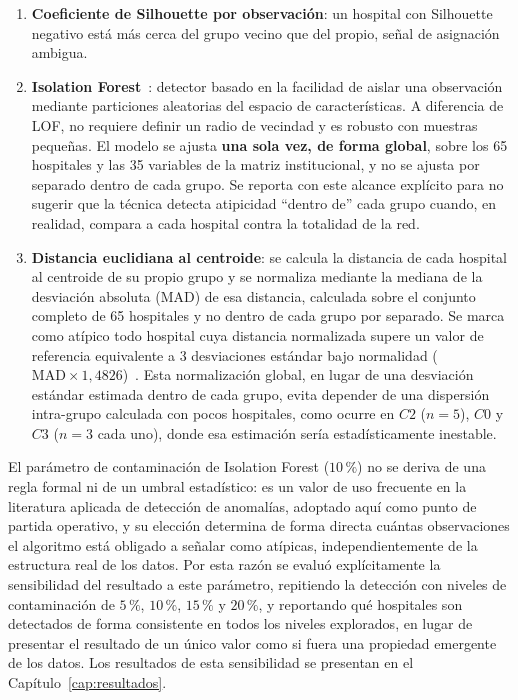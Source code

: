 \begin{enumerate}
  \item \textbf{Coeficiente de Silhouette por observación}: un hospital con
    Silhouette negativo está más cerca del grupo vecino que del propio, señal de
    asignación ambigua.
  \item \textbf{Isolation Forest}~\citep{Liu2008}: detector basado en la facilidad
    de aislar una observación mediante particiones aleatorias del espacio de
    características. A diferencia de LOF, no requiere definir un radio de
    vecindad y es robusto con muestras pequeñas. El modelo se ajusta \textbf{una
    sola vez, de forma global}, sobre los 65 hospitales y las 35 variables de la
    matriz institucional, y no se ajusta por separado dentro de cada grupo. Se
    reporta con este alcance explícito para no sugerir que la técnica detecta
    atipicidad ``dentro de'' cada grupo cuando, en realidad, compara a cada
    hospital contra la totalidad de la red.
  \item \textbf{Distancia euclidiana al centroide}: se calcula la distancia de
    cada hospital al centroide de su propio grupo y se normaliza mediante la
    mediana de la desviación absoluta (MAD) de esa distancia, calculada sobre el
    conjunto completo de 65 hospitales y no dentro de cada grupo por separado.
    Se marca como atípico todo hospital cuya distancia normalizada supere un
    valor de referencia equivalente a 3 desviaciones estándar bajo normalidad
    ($\text{MAD} \times 1{,}4826$)~\citep{Leys2013}. Esta normalización global, en lugar de una
    desviación estándar estimada dentro de cada grupo, evita depender de una
    dispersión intra-grupo calculada con pocos hospitales, como
    ocurre en $C2$ ($n=5$), $C0$ y $C3$ ($n=3$ cada uno), donde esa estimación sería
    estadísticamente inestable.
\end{enumerate}

El parámetro de contaminación de Isolation Forest ($10\,\%$) no se deriva de
una regla formal ni de un umbral estadístico: es un valor de uso frecuente en
la literatura aplicada de detección de anomalías, adoptado aquí como punto de
partida operativo, y su elección determina de forma directa cuántas
observaciones el algoritmo está obligado a señalar como atípicas,
independientemente de la estructura real de los datos. Por esta razón se
evaluó explícitamente la sensibilidad del resultado a este parámetro,
repitiendo la detección con niveles de contaminación de $5\,\%$, $10\,\%$,
$15\,\%$ y $20\,\%$, y reportando qué hospitales son detectados de forma
consistente en todos los niveles explorados, en lugar de presentar el
resultado de un único valor como si fuera una propiedad emergente de los
datos. Los resultados de esta sensibilidad se presentan en el
Capítulo~\ref{cap:resultados}.

